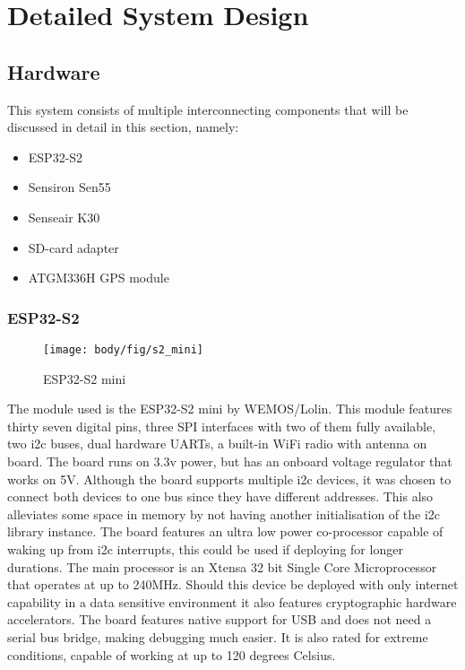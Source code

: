 \chapter{Detailed System Design}
\vspace{-2em}
\section{Hardware}


This system consists of multiple interconnecting components that will be discussed in detail in this section, namely:
\begin{itemize}
	\item ESP32-S2
	\item Sensiron Sen55
	\item Senseair K30
	\item SD-card adapter
	\item ATGM336H GPS module	
\end{itemize} 




\subsection{ESP32-S2}

\begin{figure}[!htb]
	\centering
	\texttt{[image: body/fig/s2\_mini]}
	\caption{ESP32-S2 mini}
	\label{fig:s2mini}
\end{figure}


\noindent
The module used is the ESP32-S2 mini by WEMOS/Lolin. This module features thirty seven digital pins, three SPI interfaces with two of them fully available, two i2c buses, dual hardware UARTs, a built-in WiFi radio with antenna on board. The board runs on 3.3v power, but has an onboard voltage regulator that works on 5V. Although the board supports multiple i2c devices, it was chosen to connect both devices to one bus since they have different addresses. This also alleviates some space in memory by not having another initialisation of the i2c library instance. The board features an ultra low power co-processor capable of waking up from i2c interrupts, this could be used if deploying for longer durations. The main processor is an {Xtensa\textregistered}  32 bit Single Core Microprocessor that operates at up to 240MHz. Should this device be deployed with only internet capability in a data sensitive environment it also features cryptographic hardware accelerators. The board features native support for USB and does not need a serial bus bridge, making debugging much easier. It is also rated for extreme conditions, capable of working at up to 120 degrees Celsius\cite{wemos2021s2mini}.


